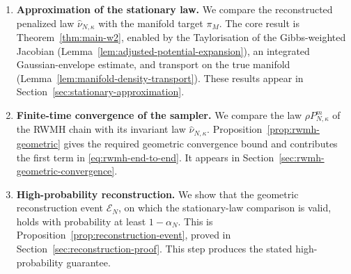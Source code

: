 \documentclass{article}
\newcommand{\cE}{\mathcal E}
\newcommand{\whatnu}{\widehat\nu_{N,\kappa}}
\numberwithin{equation}{section}
\begin{document}
\begin{enumerate}
 \item \textbf{Approximation of the stationary law.}
 We compare the reconstructed penalized law $\whatnu$ with the manifold
 target $\pi_M$. The core result is Theorem~\ref{thm:main-w2}, enabled by the
 Taylorisation of the Gibbs-weighted Jacobian
 (Lemma~\ref{lem:adjusted-potential-expansion}), an integrated
 Gaussian-envelope estimate, and transport on the true manifold
 (Lemma~\ref{lem:manifold-density-transport}). These results appear in Section~\ref{sec:stationary-approximation}.

 \item \textbf{Finite-time convergence of the sampler.}
 We compare the law $\rho P_{N,\kappa}^m$ of the RWMH chain with its
 invariant law $\whatnu$.  Proposition~\ref{prop:rwmh-geometric} gives the
 required geometric convergence bound and contributes the first term in
 \eqref{eq:rwmh-end-to-end}. It appears in
 Section~\ref{sec:rwmh-geometric-convergence}.

 \item \textbf{High-probability reconstruction.}
 We show that the geometric reconstruction event $\cE_N$, on which the
 stationary-law comparison is valid, holds with probability at least
 $1-\alpha_N$.  This is Proposition~\ref{prop:reconstruction-event}, proved
 in Section~\ref{sec:reconstruction-proof}. This step produces the stated high-probability guarantee.
\end{enumerate}
\end{document}
